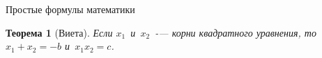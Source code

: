 \documentclass[12pt,a4paper]{scrartcl}
\begin{document}
Простые формулы математики
\newtheorem{Th}{Теорема}
\begin{Th}[Виета]\label{thViet}
Если $x_1$~и~$x_2$~-— корни
квадратного уравнения, то
$x_1 + x_2 = -b$ и~$x_1 x_2 = c$.
\end{Th}
\end{document}
